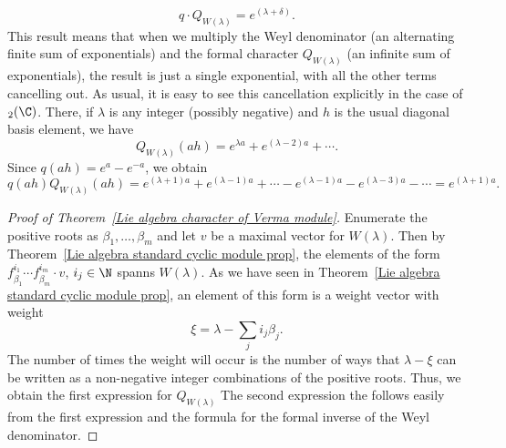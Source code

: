 \[q\cdot Q_{W(\lambda)}=e^{(\lambda+\delta)}.\]
This result means that when we multiply the Weyl denominator (an alternating finite sum of exponentials) and the formal character $Q_{W(\lambda)}$ (an infinite sum of exponentials), the result is just a single exponential, with all the other terms cancelling out. As usual, it is easy to see this cancellation explicitly in the case of $\sl_2(\C)$. There, if $\lambda$ is any integer (possibly negative) and $h$ is the usual diagonal basis element, we have
\[Q_{W(\lambda)}(ah)=e^{\lambda a}+e^{(\lambda-2)a}+\cdots.\]
Since $q(ah)=e^a-e^{-a}$, we obtain
\[q(ah)Q_{W(\lambda)}(ah)=e^{(\lambda+1)a}+e^{(\lambda-1)a}+\cdots-e^{(\lambda-1)a}-e^{(\lambda-3)a}-\cdots=e^{(\lambda+1)a}.\]
\begin{proof}[Proof of Theorem~\ref{Lie algebra character of Verma module}]
Enumerate the positive roots as $\beta_1,\dots,\beta_m$ and let $v$ be a maximal vector for $W(\lambda)$. Then by Theorem~\ref{Lie algebra standard cyclic module prop}, the elements of the form $f_{\beta_1}^{i_1}\cdots f_{\beta_m}^{i_m}\cdot v$, $i_j\in\N$ spanns $W(\lambda)$. As we have seen in Theorem~\ref{Lie algebra standard cyclic module prop}, an element of this form is a weight vector with weight
\[\xi=\lambda-\sum_ji_j\beta_j.\]
The number of times the weight will occur is the number of ways that $\lambda-\xi$ can be written as a non-negative integer combinations of the positive roots. Thus, we obtain the first expression for $Q_{W(\lambda)}$ The second expression the follows easily from the first expression and the formula for the formal inverse of the Weyl denominator.
\end{proof}
